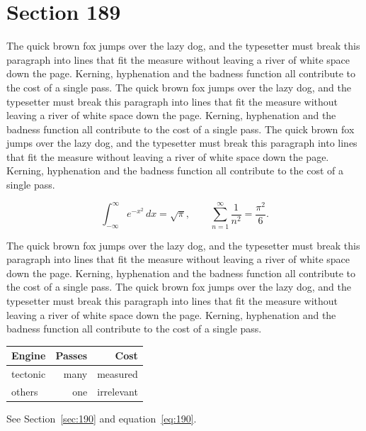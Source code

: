 \documentclass{article}
\begin{document}
\section{Section 189}
\label{sec:189}
The quick brown fox jumps over the lazy dog, and the typesetter must break this paragraph into lines that fit the measure without leaving a river of white space down the page. Kerning, hyphenation and the badness function all contribute to the cost of a single pass. The quick brown fox jumps over the lazy dog, and the typesetter must break this paragraph into lines that fit the measure without leaving a river of white space down the page. Kerning, hyphenation and the badness function all contribute to the cost of a single pass. The quick brown fox jumps over the lazy dog, and the typesetter must break this paragraph into lines that fit the measure without leaving a river of white space down the page. Kerning, hyphenation and the badness function all contribute to the cost of a single pass. 

\begin{equation}\label{eq:189}
\int_{-\infty}^{\infty} e^{-x^{2}}\,dx = \sqrt{\pi}, \qquad
\sum_{n=1}^{\infty} \frac{1}{n^{2}} = \frac{\pi^{2}}{6}.
\end{equation}

The quick brown fox jumps over the lazy dog, and the typesetter must break this paragraph into lines that fit the measure without leaving a river of white space down the page. Kerning, hyphenation and the badness function all contribute to the cost of a single pass. The quick brown fox jumps over the lazy dog, and the typesetter must break this paragraph into lines that fit the measure without leaving a river of white space down the page. Kerning, hyphenation and the badness function all contribute to the cost of a single pass. 

\begin{center}
\begin{tabular}{lrr}
\toprule
Engine & Passes & Cost \\
\midrule
tectonic & many & measured \\
others & one & irrelevant \\
\bottomrule
\end{tabular}
\end{center}

See Section~\ref{sec:190} and equation~\eqref{eq:190}.
\end{document}
